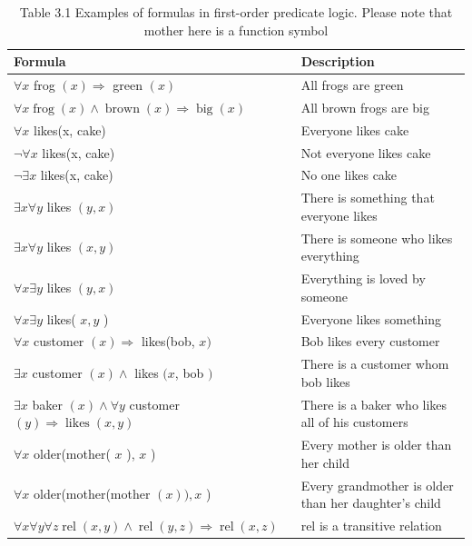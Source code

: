 \documentclass[10pt]{article}
\begin{document}
\begin{table}[h]
\begin{center}
\captionsetup{labelformat=empty}
\caption{Table 3.1 Examples of formulas in first-order predicate logic. Please note that mother here is a function symbol}
\begin{tabular}{|l|l|}
\hline
Formula & Description \\
\hline
$\forall x$ frog $(x) \Rightarrow$ green $(x)$ & All frogs are green \\
\hline
$\forall x \operatorname{frog}(x) \wedge \operatorname{brown}(x) \Rightarrow \operatorname{big}(x)$ & All brown frogs are big \\
\hline
$\forall x$ likes(x, cake) & Everyone likes cake \\
\hline
$\neg \forall x$ likes(x, cake) & Not everyone likes cake \\
\hline
$\neg \exists x$ likes(x, cake) & No one likes cake \\
\hline
$\exists x \forall y$ likes $(y, x)$ & There is something that everyone likes \\
\hline
$\exists x \forall y$ likes $(x, y)$ & There is someone who likes everything \\
\hline
$\forall x \exists y$ likes $(y, x)$ & Everything is loved by someone \\
\hline
$\forall x \exists y$ likes( $x, y$ ) & Everyone likes something \\
\hline
$\forall x$ customer $(x) \Rightarrow$ likes(bob, $x)$ & Bob likes every customer \\
\hline
$\exists x$ customer $(x) \wedge$ likes $(x$, bob $)$ & There is a customer whom bob likes \\
\hline
$\exists x$ baker $(x) \wedge \forall y$ customer $(y) \Rightarrow \operatorname{likes}(x, y)$ & There is a baker who likes all of his customers \\
\hline
$\forall x$ older(mother( $x$ ), $x$ ) & Every mother is older than her child \\
\hline
$\forall x$ older(mother(mother $(x)), x$ ) & Every grandmother is older than her daughter's child \\
\hline
$\forall x \forall y \forall z \operatorname{rel}(x, y) \wedge \operatorname{rel}(y, z) \Rightarrow \operatorname{rel}(x, z)$ & rel is a transitive relation \\
\hline
\end{tabular}
\end{center}
\end{table}
\end{document}
